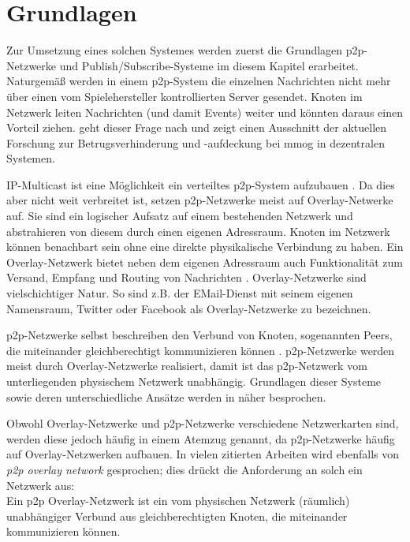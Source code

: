 \chapter{Grundlagen}
\label{chap:grundlagen}



Zur Umsetzung eines solchen Systemes werden zuerst die Grundlagen \ac{p2p}-Netzwerke und Publish/Subscribe-Systeme im diesem Kapitel erarbeitet. Naturgemäß werden in einem \ac{p2p}-System die einzelnen Nachrichten nicht mehr über einen vom Spielehersteller kontrollierten Server gesendet. Knoten im Netzwerk leiten Nachrichten (und damit Events) weiter und könnten daraus einen Vorteil ziehen.  geht dieser Frage nach und zeigt einen Ausschnitt der aktuellen Forschung zur Betrugsverhinderung und -aufdeckung bei \ac{mmog} in dezentralen Systemen.

IP-Multicast ist eine Möglichkeit ein verteiltes \ac{p2p}-System aufzubauen \cite{Deering1990Multicast}. Da dies aber nicht weit verbreitet ist, setzen \ac{p2p}-Netzwerke meist auf Overlay-Netwerke auf. Sie sind ein logischer Aufsatz auf einem bestehenden Netzwerk und abstrahieren von diesem durch einen eigenen Adressraum. Knoten im Netzwerk können benachbart sein ohne eine direkte physikalische Verbindung zu haben. Ein Overlay-Netzwerk bietet neben dem eigenen Adressraum auch Funktionalität zum Versand, Empfang und Routing von Nachrichten \cite{Tannenbaum2003}. Overlay-Netzwerke sind vielschichtiger Natur. So sind z.B. der EMail-Dienst mit seinem eigenen Namensraum, Twitter oder Facebook als Overlay-Netzwerke zu bezeichnen.

p2p-Netzwerke selbst beschreiben den Verbund von Knoten, sogenannten Peers, die miteinander gleichberechtigt kommunizieren können \cite{Steinmetz2005}. p2p-Netzwerke werden meist durch Overlay-Netzwerke realisiert, damit ist das p2p-Netzwerk vom unterliegenden physischem Netzwerk unabhängig. Grundlagen dieser Systeme sowie deren unterschiedliche Ansätze werden in  näher besprochen.

Obwohl Overlay-Netzwerke und \ac{p2p}-Netzwerke verschiedene Netzwerkarten sind, werden diese jedoch häufig in einem Atemzug genannt, da p2p-Netzwerke häufig auf Overlay-Netzwerken aufbauen. In vielen zitierten Arbeiten wird ebenfalls von \emph{p2p overlay network} gesprochen; dies drückt die Anforderung an solch ein Netzwerk aus:\\
Ein p2p Overlay-Netzwerk ist ein vom physischen Netzwerk (räumlich) unabhängiger Verbund aus gleichberechtigten Knoten, die miteinander kommunizieren können.








